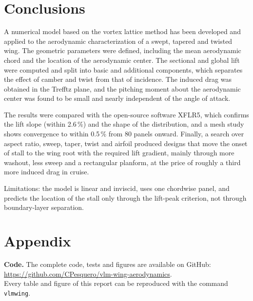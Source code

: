 \documentclass[11pt,letterpaper]{article}
\newcommand{\repo}{\url{https://github.com/CPesquero/vlm-wing-aerodynamics}}
\begin{document}
\section{Conclusions}
A numerical model based on the vortex lattice method has been developed and applied to the
aerodynamic characterization of a swept, tapered and twisted wing. The geometric parameters were
defined, including the mean aerodynamic chord and the location of the aerodynamic center. The
sectional and global lift were computed and split into basic and additional components, which
separates the effect of camber and twist from that of incidence. The induced drag was obtained in
the Trefftz plane, and the pitching moment about the aerodynamic center was found to be small and
nearly independent of the angle of attack.

The results were compared with the open-source software XFLR5, which confirms the lift slope
(within 2.6\,\%) and the shape of the distribution, and a mesh study shows convergence to within
0.5\,\% from 80 panels onward. Finally, a search over aspect ratio, sweep, taper, twist and airfoil
produced designs that move the onset of stall to the wing root with the required lift gradient,
mainly through more washout, less sweep and a rectangular planform, at the price of roughly a third
more induced drag in cruise.

Limitations: the model is linear and inviscid, uses one chordwise panel, and predicts the location
of the stall only through the lift-peak criterion, not through boundary-layer separation.

\section{Appendix}
\textbf{Code.} The complete code, tests and figures are available on GitHub:\\ \repo.\\ Every table and
figure of this report can be reproduced with the command \texttt{vlmwing}.
\end{document}

